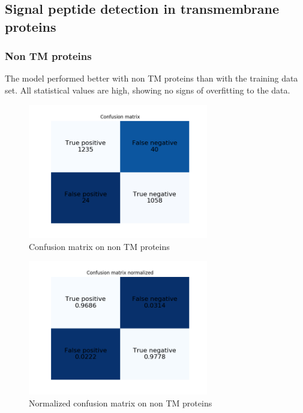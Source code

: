 \subsection{Signal peptide detection in transmembrane proteins}

\subsubsection{Non TM proteins}

The model performed better with non TM proteins than with the training data set. All statistical values are high, showing no signs of overfitting to the data.

\begin{figure}[H]
\center
\includegraphics[width=0.7\textwidth]{pictures/non_tm_cm.png}
\caption{\label{fig:non_tm_cm}Confusion matrix on non TM proteins}
\end{figure}

\begin{figure}[H]
\center
\includegraphics[width=0.7\textwidth]{pictures/non_tm_cm_normalized.png}
\caption{\label{fig:non_tm_normalized_cm}Normalized confusion matrix on non TM proteins}
\end{figure}

